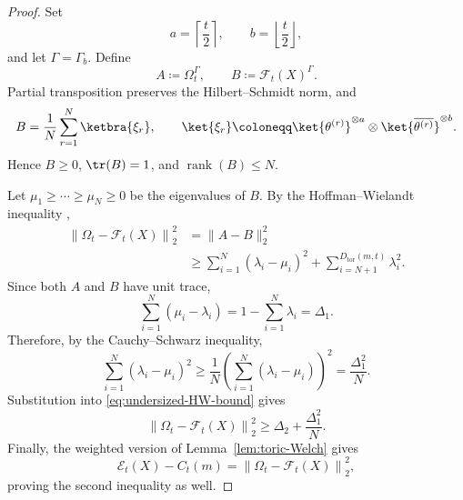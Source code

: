\documentclass[aps,twocolumn,pra,superscriptaddress,nofootinbib]{revtex4-2}
\newcommand{\mF}{\mathcal{F}}
\begin{document}
\begin{proof}
    Set
    \begin{equation}
        a=\left\lceil\frac{t}{2}\right\rceil,
        \qquad
        b=\left\lfloor\frac{t}{2}\right\rfloor,
    \end{equation}
    and let $\mathsf{\Gamma}=\mathsf{\Gamma}_b$. Define
    \begin{equation}
        A\coloneqq\Omega_t^{\mathsf{\Gamma}},
        \qquad
        B\coloneqq\mF_t(X)^{\mathsf{\Gamma}}.
    \end{equation}
    Partial transposition preserves the Hilbert--Schmidt norm, and
    \begin{equation}
        B
        =
        \frac{1}{N}\sum_{r=1}^{N}\ketbra{\xi_r},
        \qquad
        \ket{\xi_r}
        \coloneqq
        \ket{\theta^{(r)}}^{\otimes a}
        \otimes
        \ket{\overline{\theta^{(r)}}}^{\otimes b}.
    \end{equation}
    Hence $B\geq0$, $\tr(B)=1$, and $\operatorname{rank}(B)\leq N$.

    Let $\mu_1\geq\cdots\geq\mu_N\geq0$ be the {eigenvalues
    of $B$}. By the
    Hoffman--Wielandt inequality \cite{HoffmanWielandt1953},
    \begin{align}
        \left\|\Omega_t-\mF_t(X)\right\|_2^2
        &=
        \|A-B\|_2^2
        \nonumber\\
        &\geq
        \sum_{i=1}^{N}(\lambda_i-\mu_i)^2
        +
        \sum_{i=N+1}^{{D_{\mathrm{tor}}(m,t)}}\lambda_i^2.
        \label{eq:undersized-HW-bound}
    \end{align}
    Since both $A$ and $B$ have unit trace,
    \begin{equation}
        \sum_{i=1}^{N}(\mu_i-\lambda_i)
        =
        1-\sum_{i=1}^{N}\lambda_i
        =
        \Delta_1.
    \end{equation}
    Therefore, by the Cauchy--Schwarz inequality,
    \begin{equation}
        \sum_{i=1}^{N}(\lambda_i-\mu_i)^2
        \geq
        \frac{1}{N}
        \left(
            \sum_{i=1}^{N}(\lambda_i-\mu_i)
        \right)^2
        =
        \frac{\Delta_1^2}{N}.
    \end{equation}
    Substitution into \eqref{eq:undersized-HW-bound} gives
    \begin{equation}
        \left\|\Omega_t-\mF_t(X)\right\|_2^2
        \geq
        \Delta_2+\frac{\Delta_1^2}{N}.
    \end{equation}
    Finally, the weighted version of
    Lemma~\ref{lem:toric-Welch} gives
    \begin{equation}
        \mathcal{E}_t(X)-C_t(m)
        =
        \left\|\Omega_t-\mF_t(X)\right\|_2^2,
    \end{equation}
    proving the second inequality as well.
\end{proof}
\end{document}
